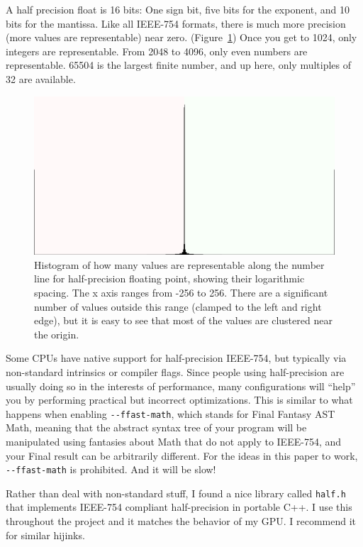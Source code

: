 \documentclass[twocolumn]{article}
\begin{document}
A half precision float is 16 bits: One sign bit, five bits for the
exponent, and 10 bits for the mantissa. Like all IEEE-754 formats,
there is much more precision (more values are representable) near
zero. (Figure~\ref{fig:histogram}) Once you get to 1024,
only integers are representable. From 2048 to 4096, only even numbers
are representable. 65504 is the largest finite number, and up here,
only multiples of 32 are available.

\begin{figure}
  \begin{center}
    \includegraphics[width=0.65 \linewidth]{histo}
  \end{center}
\caption{
  Histogram of how many values are representable along the
  number line for half-precision floating point, showing
  their logarithmic spacing. The x axis
  ranges from -256 to 256. There are a significant number of
  values outside this range (clamped to the left and right
  edge), but it is easy to see that most of the values are
  clustered near the origin.
  } \label{fig:histogram}
\end{figure}

Some CPUs have native support for half-precision IEEE-754, but typically
via non-standard intrinsics or compiler flags. Since people using
half-precision are usually doing so in the interests of performance,
many configurations will ``help'' you by performing practical but
incorrect optimizations. This is similar to what happens when enabling
\verb|--ffast-math|, which stands for Final Fantasy AST Math, meaning
that the abstract syntax tree of your program will be manipulated
using fantasies about Math that do not apply to IEEE-754, and your
Final result can be arbitrarily different. For the ideas in this paper
to work, \verb|--ffast-math| is prohibited. And it will be slow!

Rather than deal with non-standard stuff, I found a nice library
called {\tt half.h}~\cite{half} that implements IEEE-754 compliant
half-precision in portable C++. I use this throughout the project
and it matches the behavior of my GPU. I recommend it for similar
hijinks.
\end{document}
